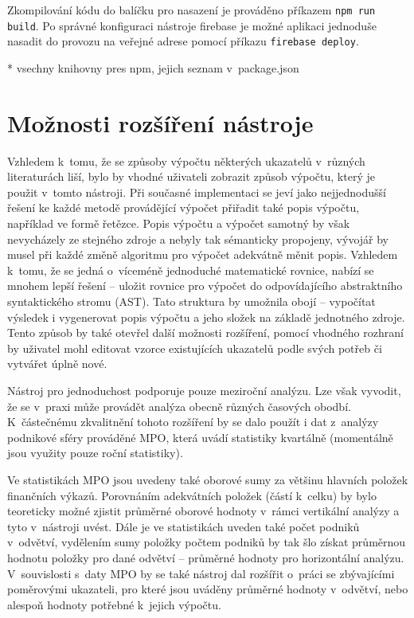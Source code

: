 Zkompilování kódu do balíčku pro nasazení je prováděno příkazem \texttt{npm run build}. Po správné konfiguraci nástroje firebase je možné aplikaci jednoduše nasadit do provozu na veřejné adrese pomocí příkazu \texttt{firebase deploy}.



* vsechny knihovny pres npm, jejich seznam v~package.json


\section{Možnosti rozšíření nástroje}

Vzhledem k~tomu, že se způsoby výpočtu některých ukazatelů v~různých literaturách liší, bylo by vhodné uživateli zobrazit způsob výpočtu, který je použit v~tomto nástroji. Při současné implementaci se jeví jako nejjednodušší řešení ke každé metodě provádějící výpočet přiřadit také popis výpočtu, například ve formě řetězce. Popis výpočtu a výpočet samotný by však nevycházely ze stejného zdroje a nebyly tak sémanticky propojeny, vývojář by musel při každé změně algoritmu pro výpočet adekvátně měnit popis. Vzhledem k~tomu, že se jedná o~víceméně jednoduché matematické rovnice, nabízí se mnohem lepší řešení -- uložit rovnice pro výpočet do odpovídajícího abstraktního syntaktického stromu (AST). Tato struktura by umožnila obojí -- vypočítat výsledek i vygenerovat popis výpočtu a jeho složek na základě jednotného zdroje. Tento způsob by také otevřel další možnosti rozšíření, pomocí vhodného rozhraní by uživatel mohl editovat vzorce existujících ukazatelů podle svých potřeb či vytvářet úplně nové.

Nástroj pro jednoduchost podporuje pouze meziroční analýzu. Lze však vyvodit, že se v~praxi může provádět analýza obecně různých časových obodbí. K~částečnému zkvalitnění tohoto rozšíření by se dalo použít i dat z~analýzy podnikové sféry prováděné MPO, která uvádí statistiky kvartálně (momentálně jsou využity pouze roční statistiky).

Ve statistikách MPO jsou uvedeny také oborové sumy za většinu hlavních položek finančních výkazů. Porovnáním adekvátních položek (částí k~celku) by bylo teoreticky možné zjistit průměrné oborové hodnoty v~rámci vertikální analýzy a tyto v~nástroji uvést. Dále je ve statistikách uveden také počet podniků v~odvětví, vydělením sumy položky počtem podniků by tak šlo získat průměrnou hodnotu položky pro dané odvětví -- průměrné hodnoty pro horizontální analýzu. V~souvislosti s~daty MPO by se také nástroj dal rozšířit o~práci se zbývajícími poměrovými ukazateli, pro které jsou uváděny průměrné hodnoty v~odvětví, nebo alespoň hodnoty potřebné k~jejich výpočtu.


